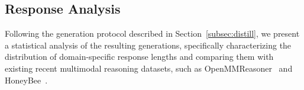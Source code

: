 
% 




\subsection{Response Analysis}\label{subsec:response}
Following the generation protocol described in Section~\ref{subsec:distill}, we present a statistical analysis of the resulting generations, specifically characterizing the distribution of domain-specific response lengths and comparing them with existing recent multimodal reasoning datasets, such as OpenMMReasoner~\cite{openmmreasoner} and HoneyBee~\cite{honeybee}.

